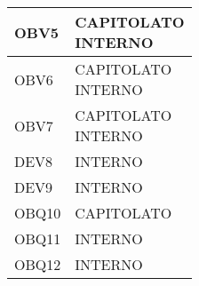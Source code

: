 \documentclass{scalatekids-article}
\begin{document}
\begin{longtable}[H]{|p{5.5cm}|p{5.5cm}|}
\hline
OBV5 & \multiLineCell[t]{CAPITOLATO\\INTERNO\\}\\
\hline
OBV6 & \multiLineCell[t]{CAPITOLATO\\INTERNO\\}\\
\hline
OBV7 & \multiLineCell[t]{CAPITOLATO\\INTERNO\\}\\
\hline
DEV8 & \multiLineCell[t]{INTERNO\\}\\
\hline
DEV9 & \multiLineCell[t]{INTERNO\\}\\
\hline
OBQ10 & \multiLineCell[t]{CAPITOLATO\\}\\
\hline
OBQ11 & \multiLineCell[t]{INTERNO\\}\\
\hline
OBQ12 & \multiLineCell[t]{INTERNO\\}\\
\hline
\end{longtable}
\end{document}

